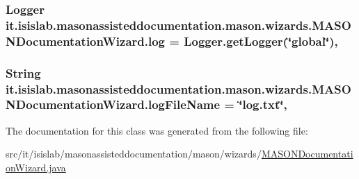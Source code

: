 \hypertarget{classit_1_1isislab_1_1masonassisteddocumentation_1_1mason_1_1wizards_1_1_m_a_s_o_n_documentation_wizard_a8f7543d2b138041bdb2657c38afba3ac}{
\subsubsection[{log}]{\setlength{\rightskip}{0pt plus 5cm}Logger it.\-isislab.\-masonassisteddocumentation.\-mason.\-wizards.\-M\-A\-S\-O\-N\-Documentation\-Wizard.\-log = Logger.\-get\-Logger(\char`\"{}global\char`\"{})\hspace{0.3cm}{\ttfamily [static]}, {\ttfamily [private]}}}\label{classit_1_1isislab_1_1masonassisteddocumentation_1_1mason_1_1wizards_1_1_m_a_s_o_n_documentation_wizard_a8f7543d2b138041bdb2657c38afba3ac}
\hypertarget{classit_1_1isislab_1_1masonassisteddocumentation_1_1mason_1_1wizards_1_1_m_a_s_o_n_documentation_wizard_a4bd1c3db48ee70d751a4249cc3cf97c3}{
\subsubsection[{log\-File\-Name}]{\setlength{\rightskip}{0pt plus 5cm}String it.\-isislab.\-masonassisteddocumentation.\-mason.\-wizards.\-M\-A\-S\-O\-N\-Documentation\-Wizard.\-log\-File\-Name = \char`\"{}log.\-txt\char`\"{}\hspace{0.3cm}{\ttfamily [static]}, {\ttfamily [private]}}}\label{classit_1_1isislab_1_1masonassisteddocumentation_1_1mason_1_1wizards_1_1_m_a_s_o_n_documentation_wizard_a4bd1c3db48ee70d751a4249cc3cf97c3}


The documentation for this class was generated from the following file\-:\begin{DoxyCompactItemize}
\item 
src/it/isislab/masonassisteddocumentation/mason/wizards/\hyperlink{_m_a_s_o_n_documentation_wizard_8java}{M\-A\-S\-O\-N\-Documentation\-Wizard.\-java}\end{DoxyCompactItemize}
